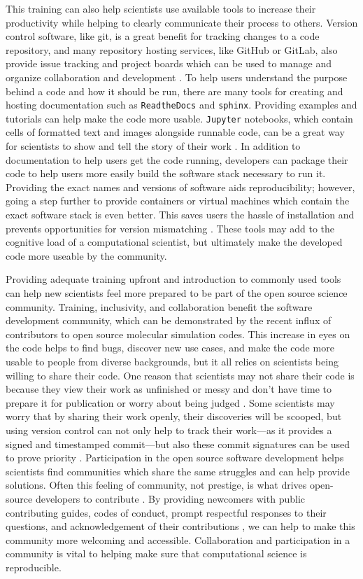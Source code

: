 This training can also help scientists use available tools to increase their productivity while helping to clearly communicate their process to others. 
Version control software, like git, is a great benefit for tracking changes to a code repository, and many repository hosting services, like GitHub or GitLab, also provide issue tracking and project boards which can be used to manage and organize collaboration and development \cite{Gentzkow2014}.
To help users understand the purpose behind a code and how it should be run, there are many tools for creating and hosting documentation such as \texttt{ReadtheDocs} and \texttt{sphinx}.
Providing examples and tutorials can help make the code more usable.
\texttt{Jupyter} notebooks, which contain cells of formatted text and images alongside runnable code, can be a great way for scientists to show and tell the story of their work \cite{Rule2019a}.
In addition to documentation to help users get the code running, developers can package their code to help users more easily build the software stack necessary to run it.
Providing the exact names and versions of software aids reproducibility; however, going a step further to provide containers or virtual machines which contain the exact software stack is even better. This saves users the hassle of installation and prevents opportunities for version mismatching \cite{Cito2016, Shirts2008a}.
These tools may add to the cognitive load of a computational scientist, but ultimately make the developed code more useable by the community.

Providing adequate training upfront and introduction to commonly used tools can help new scientists feel more prepared to be part of the open source science community.
Training, inclusivity, and collaboration benefit the software development community, which can be demonstrated by the recent influx of contributors to open source molecular simulation codes\cite{Jankowski2019}.
This increase in eyes on the code helps to find bugs, discover new use cases, and make the code more usable to people from diverse backgrounds, but it all relies on scientists being willing to share their code.
One reason that scientists may not share their code is because they view their work as unfinished or messy and don't have time to prepare it for publication or worry about being judged \cite{Irving2016}.
Some scientists may worry that by sharing their work openly, their discoveries will be scooped, but using version control can not only help to track their work---as it provides a signed and timestamped commit---but also these commit signatures can be used to prove priority \cite{Blischak2016}. 
Participation in the open source software development helps scientists find communities which share the same struggles and can help provide solutions.
Often this feeling of community, not prestige, is what drives open-source developers to contribute \cite{Smirnova2022}.
By providing newcomers with public contributing guides, codes of conduct, prompt respectful responses to their questions, and acknowledgement of their contributions \cite{Sholler2019}, we can help to make this community more welcoming and accessible.
Collaboration and participation in a community is vital to helping make sure that computational science is reproducible. 

